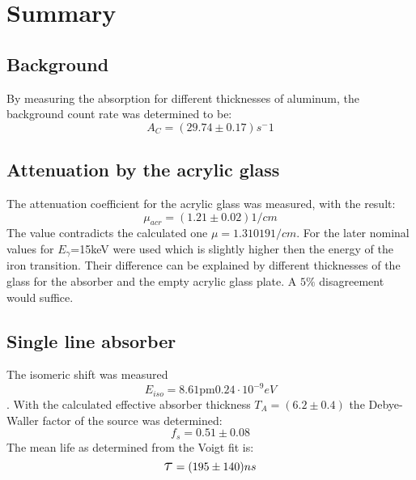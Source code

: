 \section{Summary}
\subsection{Background}
By measuring the absorption for different thicknesses of aluminum, the background count rate was determined to be:
\begin{equation*}
A_C= (29.74\pm0.17)s^-1
\end{equation*}	
\subsection{Attenuation by the acrylic glass}
The attenuation coefficient for the acrylic glass was measured, with the result:
\begin{equation*}
\mu_{acr}=\unit{(1.21\pm0.02)}{1/cm}
\end{equation*}
The value contradicts the calculated one $\mu=\unit{1.31019}{1/cm}$. For the later nominal values for $E_\gamma$=\unit{15}{keV} were used which is slightly higher then the energy of the iron transition. Their difference can be explained by different thicknesses of the glass for the absorber and the empty acrylic glass plate. A $5\%$ disagreement would suffice.
\subsection{Single line absorber}
The isomeric shift was measured
\begin{equation*}
E_{iso}= \unit{8.61\pm0.24\cdot10^{-9}}{eV}
\end{equation*}. 
With the calculated effective absorber thickness $T_A=(6.2\pm0.4)$ the Debye-Waller factor of the source was determined:
\begin{equation*}
f_s=0.51\pm0.08
\end{equation*}
The mean life as determined from the Voigt fit is:
\begin{equation*}
\scalebox{1.5}{$\tau$}=\unit{(195\pm140)}{ns}
\end{equation*}

